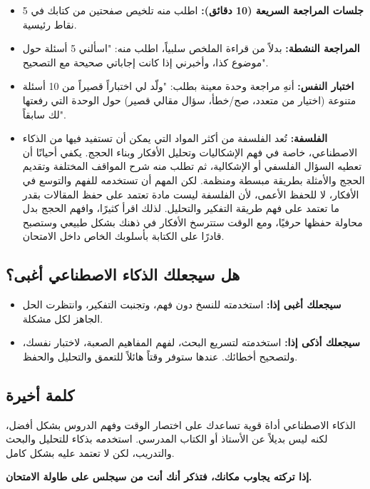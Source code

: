 \documentclass[12pt,a4paper]{book}
\newcommand{\importantAr}[1]{%
	\begin{important}
		\bfseries #1
	\end{important}
}
\begin{document}
\begin{itemize}
	\item \textbf{جلسات المراجعة السريعة (10 دقائق):} اطلب منه تلخيص صفحتين من كتابك في 5 نقاط رئيسية.
	\item \textbf{المراجعة النشطة:} بدلاً من قراءة الملخص سلبياً، اطلب منه: "اسألني 5 أسئلة حول موضوع كذا، وأخبرني إذا كانت إجاباتي صحيحة مع التصحيح".
	\item \textbf{اختبار النفس:} أنهِ مراجعة وحدة معينة بطلب: "ولّد لي اختباراً قصيراً من 10 أسئلة متنوعة (اختيار من متعدد، صح/خطأ، سؤال مقالي قصير) حول الوحدة التي رفعتها لك سابقاً".
	\item \textbf{الفلسفة:} تُعد الفلسفة من أكثر المواد التي يمكن أن تستفيد فيها من الذكاء الاصطناعي، خاصة في فهم الإشكاليات وتحليل الأفكار وبناء الحجج. يكفي أحيانًا أن تعطيه السؤال الفلسفي أو الإشكالية، ثم تطلب منه شرح المواقف المختلفة وتقديم الحجج والأمثلة بطريقة مبسطة ومنظمة. لكن المهم أن تستخدمه للفهم والتوسع في الأفكار، لا للحفظ الأعمى، لأن الفلسفة ليست مادة تعتمد على حفظ المقالات بقدر ما تعتمد على فهم طريقة التفكير والتحليل. لذلك اقرأ كثيرًا، وافهم الحجج بدل محاولة حفظها حرفيًا، ومع الوقت ستترسخ الأفكار في ذهنك بشكل طبيعي وستصبح قادرًا على الكتابة بأسلوبك الخاص داخل الامتحان.
\end{itemize}

\subsection{هل سيجعلك الذكاء الاصطناعي أغبى؟}
\begin{itemize}
	\item \textbf{سيجعلك أغبى إذا:} استخدمته للنسخ دون فهم، وتجنبت التفكير، وانتظرت الحل الجاهز لكل مشكلة.
	\item \textbf{سيجعلك أذكى إذا:} استخدمته لتسريع البحث، لفهم المفاهيم الصعبة، لاختبار نفسك، ولتصحيح أخطائك. عندها ستوفر وقتاً هائلاً للتعمق والتحليل والحفظ.
\end{itemize}
\subsection{كلمة أخيرة}

	الذكاء الاصطناعي أداة قوية تساعدك على اختصار الوقت وفهم الدروس بشكل أفضل، لكنه ليس بديلاً عن الأستاذ أو الكتاب المدرسي. استخدمه بذكاء للتحليل والبحث والتدريب، لكن لا تعتمد عليه بشكل كامل. 
	\importantAr{إذا تركته يجاوب مكانك، فتذكر أنك أنت من سيجلس على طاولة الامتحان.
}
	
\end{document}
